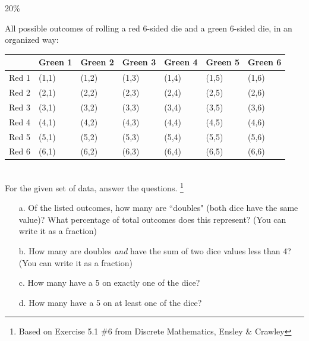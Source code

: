 \documentclass[a4paper,12pt]{book}
\begin{document}
        \begin{question}{5}{20\%}

            All possible outcomes of rolling a red 6-sided die and a green 6-sided die,
            in an organized way: ~\\

            \begin{tabular}{ l | l l l l l l }
                & Green 1 & Green 2 & Green 3 & Green 4 & Green 5 & Green 6 \\ \hline
                Red 1 & (1,1) & (1,2) & (1,3) & (1,4) & (1,5) & (1,6) \\
                Red 2 & (2,1) & (2,2) & (2,3) & (2,4) & (2,5) & (2,6) \\
                Red 3 & (3,1) & (3,2) & (3,3) & (3,4) & (3,5) & (3,6) \\
                Red 4 & (4,1) & (4,2) & (4,3) & (4,4) & (4,5) & (4,6) \\
                Red 5 & (5,1) & (5,2) & (5,3) & (5,4) & (5,5) & (5,6) \\
                Red 6 & (6,1) & (6,2) & (6,3) & (6,4) & (6,5) & (6,6) \\
                
            \end{tabular}
            ~\\

            For the given set of data, answer the questions.
            \footnote{Based on Exercise 5.1 \#6 from Discrete Mathematics, Ensley \& Crawley}

            \begin{enumerate}
                \item[a.]   Of the listed outcomes, how many are ``doubles"
                            (both dice have the same value)? What percentage of
                            total outcomes does this represent?
                            (You can write it as a fraction)

                \item[b.]   How many are doubles \textit{and} have the sum
                            of two dice values less than 4?
                            (You can write it as a fraction)

                \item[c.]   How many have a 5 on exactly one of the dice?

                \item[d.]   How many have a 5 on at least one of the dice?
            \end{enumerate}
            
        \end{question}
                
\end{document}

